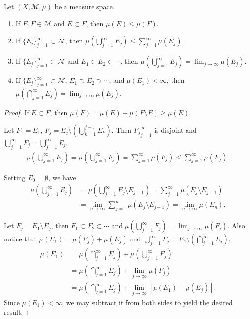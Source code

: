 \begin{theorem}
    Let $(X, \mathcal{M}, \mu)$ be a measure space.
    \begin{enumerate}
        \item If $E, F \in \mathcal{M}$ and $E \subset F$, then $\mu(E) \le \mu(F)$.
        \item If $\{ E_{j} \}_{j=1}^{\infty} \subset \mathcal{M}$, then $\mu(\bigcup_{j=1}^{\infty} E_j) \le \sum _{j=1}^{\infty} \mu(E_j)$.
        \item If $\{ E_{j} \}_{j=1}^{\infty} \subset \mathcal{M}$ and $E_1 \subset E_2 \subset \cdots$, then $\mu(\bigcup_{j=1}^{\infty} E_j) = \lim_{j\to \infty} \mu(E_j)$.
        \item If $\{ E_{j} \}_{j=1}^{\infty} \subset \mathcal{M}$, $E_1 \supset E_2 \supset \cdots$, and $\mu(E_1) < \infty$, then $\mu(\bigcap_{j=1}^{\infty} E_j) = \lim_{j\to \infty} \mu(E_j)$.
    \end{enumerate}
\end{theorem}

\begin{proof}
    If $E \subset F$, then $\mu(F) = \mu(E) + \mu(F \setminus E) \ge \mu(E)$.

    Let $F_1 = E_1$, $F_j = E_j \setminus (\bigcup_{k=1}^{j-1} E_k)$.
    Then ${F_j}_{j=1}^{\infty}$ is disjoint and $\bigcup_{j=1}^{\infty} F_j = \bigcup_{j=1}^{\infty} E_j$.
    \begin{align}
        \mu \left( \bigcup_{j=1}^{\infty} E_j \right) = \mu \left( \bigcup_{j=1}^{\infty} F_j \right) = \sum_{j=1}^{\infty} \mu(F_j) \le \sum_{j=1}^{\infty} \mu(E_j).
    \end{align}

    Setting $E_0 = \emptyset$, we have
    \begin{align}
        \mu \left( \bigcup_{j=1}^{\infty} E_j \right) & = \mu \left( \bigcup_{j=1}^{\infty} E_j \setminus E_{j-1} \right) = \sum_{j=1}^{\infty} \mu(E_j \setminus E_{j-1}) \\
                                         & = \lim_{n \to \infty} \sum_{j=1}^{n} \mu(E_j \setminus E_{j-1}) = \lim_{n \to \infty} \mu(E_n).
    \end{align}

    Let $F_j = E_1 \setminus E_j$, then $F_1 \subset F_2 \subset \cdots$ and $\mu(\bigcup_{j=1}^{\infty} F_j) = \lim_{j\to \infty} \mu(F_j)$.
    Also notice that $\mu(E_1) = \mu(F_j) + \mu(E_j)$ and $\bigcup_{j=1}^{\infty} F_j = E_1 \setminus \left( \bigcap_{j=1}^{\infty} E_j \right)$.
    \begin{align}
        \mu(E_1) & = \mu \left( \bigcap_{j=1}^{\infty} E_j \right) + \mu \left(\bigcup_{j=1}^{\infty} F_j \right) \\
                 & = \mu \left( \bigcap_{j=1}^{\infty} E_j \right) + \lim_{j\to \infty} \mu(F_j)               \\
                 & = \mu \left( \bigcap_{j=1}^{\infty} E_j \right) + \lim_{j\to \infty} [\mu(E_1) - \mu(E_j)].
    \end{align}
    Since $\mu(E_1) < \infty$, we may subtract it from both sides to yield the desired result.
\end{proof}

